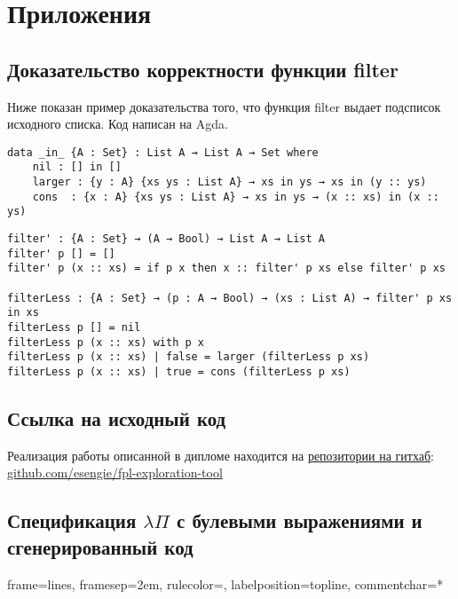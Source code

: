 \appendix
\section*{Приложения}
\renewcommand{\thesubsection}{\Alph{subsection}}

\subsection{Доказательство корректности функции filter}\label{sort_proof}

Ниже показан пример доказательства того, что функция filter выдает подсписок исходного списка.
Код написан на Agda\cite{agda}.


\begin{lstlisting}[caption={Определяем предикат означающий ``список xs является подсписком ys''},captionpos=b, frame=single]
data _in_ {A : Set} : List A → List A → Set where
    nil : [] in []
    larger : {y : A} {xs ys : List A} → xs in ys → xs in (y :: ys)
    cons  : {x : A} {xs ys : List A} → xs in ys → (x :: xs) in (x :: ys)
\end{lstlisting}



\begin{lstlisting}[caption={Докажем, что filter xs подсписок xs для любого списка xs},captionpos=b, frame=single]
filter' : {A : Set} → (A → Bool) → List A → List A
filter' p [] = []
filter' p (x :: xs) = if p x then x :: filter' p xs else filter' p xs

filterLess : {A : Set} → (p : A → Bool) → (xs : List A) → filter' p xs in xs
filterLess p [] = nil
filterLess p (x :: xs) with p x
filterLess p (x :: xs) | false = larger (filterLess p xs)
filterLess p (x :: xs) | true = cons (filterLess p xs)
\end{lstlisting}


\subsection{Ссылка на исходный код}\label{source_code}
Реализация работы описанной в дипломе находится на \href{https://github.com/esengie/fpl-exploration-tool}{репозитории на гитхаб}: \url{github.com/esengie/fpl-exploration-tool}

\pagebreak
\subsection{Спецификация $\lambda\Pi$ с булевыми выражениями и сгенерированный код}\label{lambdaPiSpec}

{}%
{
 frame=lines,  %
 framesep=2em, %
 rulecolor=\color{Gray},
 labelposition=topline,
 commentchar=*        %
}


